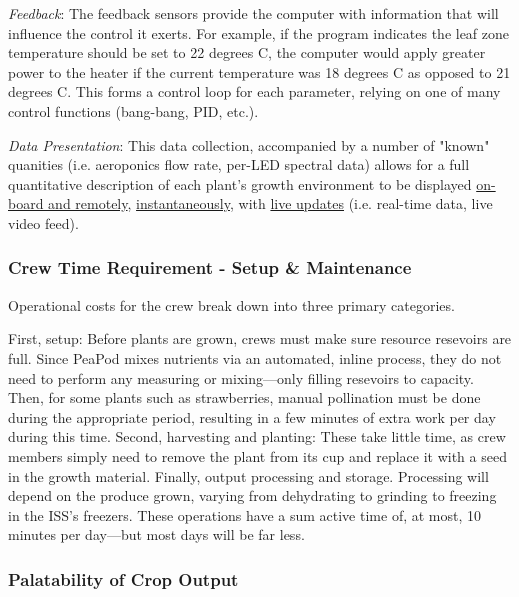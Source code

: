 \documentclass{report}
\begin{document}
\textit{Feedback}: The feedback sensors provide the computer with information that will influence the control it exerts. For example, if the program indicates the leaf zone temperature should be set to 22 degrees C, the computer would apply greater power to the heater if the current temperature was 18 degrees C as opposed to 21 degrees C. This forms a control loop for each parameter, relying on one of many control functions (bang-bang, PID, etc.).

\textit{Data Presentation}: This data collection, accompanied by a number of "known" quanities (i.e. aeroponics flow rate, per-LED spectral data) allows for a full quantitative description of each plant's growth environment to be displayed \uline{on-board and remotely}, \uline{instantaneously}, with \uline{live updates} (i.e. real-time data, live video feed).


\subsubsection{Crew Time Requirement - Setup \& Maintenance}
\label{sec:constraints-crewtime} 
Operational costs for the crew break down into three primary categories.

First, setup: Before plants are grown, crews must make sure resource resevoirs are full. Since PeaPod mixes nutrients via an automated, inline process, they do not need to perform any measuring or mixing---only filling resevoirs to capacity. Then, for some plants such as strawberries, manual pollination must be done during the appropriate period, resulting in a few minutes of extra work per day during this time. Second, harvesting and planting: These take little time, as crew members simply need to remove the plant from its cup and replace it with a seed in the growth material. Finally, output processing and storage. Processing will depend on the produce grown, varying from dehydrating to grinding to freezing in the ISS's freezers. These operations have a sum active time of, at most, 10 minutes per day---but most days will be far less.



\subsubsection{Palatability of Crop Output} 
\label{sec:constraints-palatability}
\end{document}

